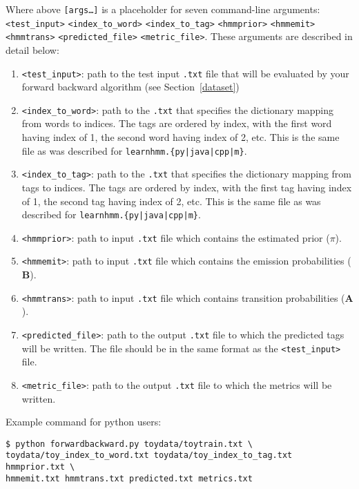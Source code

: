 \documentclass[11pt,addpoints,answers]{exam}
\numberwithin{equation}{section} %
\numberwithin{figure}{section} %
\numberwithin{table}{section} %
\begin{document}
Where above \texttt{[args\dots]} is a placeholder for seven command-line arguments:\texttt{<test\_input>} \texttt{<index\_to\_word>} \texttt{<index\_to\_tag>} \texttt{<hmmprior>} \texttt{<hmmemit>} \texttt{<hmmtrans>} \texttt{<predicted\_file>} \texttt{<metric\_file>}. These arguments are described in detail below:
\begin{enumerate}
    \item \texttt{<test\_input>}: path to the test input \texttt{.txt} file that will be evaluated by your forward backward algorithm (see Section~\ref{dataset})
    \item \texttt{<index\_to\_word>}: path to the \texttt{.txt} that specifies the dictionary mapping from words to indices. The tags are ordered by index, with the first word having index of 1, the second word having index of 2, etc. This is the same file as was described for \texttt{learnhmm.\{py|java|cpp|m\}}.
    \item \texttt{<index\_to\_tag>}: path to the \texttt{.txt} that specifies the dictionary mapping from tags to indices. The tags are ordered by index, with the first tag having index of 1, the second tag having index of 2, etc. This is the same file as was described for \texttt{learnhmm.\{py|java|cpp|m\}}.
    \item \texttt{<hmmprior>}: path to input \texttt{.txt} file which contains the estimated prior (\boldmath${\pi}$).
    \item \texttt{<hmmemit>}: path to input \texttt{.txt} file which contains the emission probabilities ($\mathbf B$).
    \item \texttt{<hmmtrans>}: path to input \texttt{.txt} file which contains transition probabilities ($\mathbf A$).
    \item \texttt{<predicted\_file>}: path to the output \texttt{.txt} file to which the predicted tags will be written. The file should be in the same format as the \texttt{<test\_input>} file. 
    \item \texttt{<metric\_file>}: path to the output \texttt{.txt} file to which the metrics will be written. 
\end{enumerate}


Example command for python users:
\begin{lstlisting}
$ python forwardbackward.py toydata/toytrain.txt \
toydata/toy_index_to_word.txt toydata/toy_index_to_tag.txt hmmprior.txt \
hmmemit.txt hmmtrans.txt predicted.txt metrics.txt
\end{lstlisting}
\end{document}
